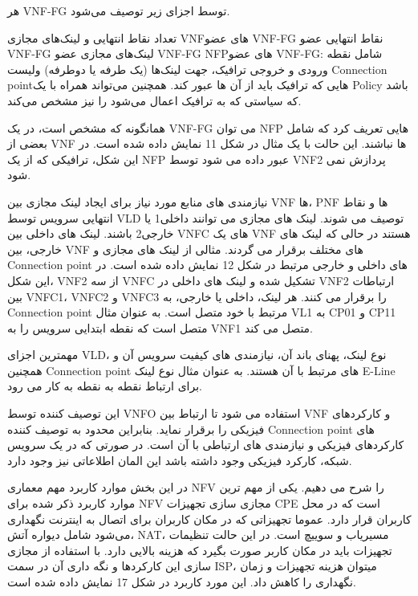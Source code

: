 \documentclass{book}
\begin{document}
هر VNF-FG توسط اجزای زیر توصیف می‌شود.

 تعداد نقاط انتهایی و لینک‌های مجازی
 VNFهای عضو VNF-FG
 نقاط انتهایی عضو VNF-FG
 لینک‌های مجازی عضو VNF-FG
 NFPهای عضو VNF-FG: شامل نقطه ورودی و خروجی ترافیک، جهت لینک‌ها (یک طرفه یا دوطرفه) ولیست Connection pointهایی که ترافیک باید از آن ها عبور کند. همچنین می‌تواند همراه با یک Policy باشد که سیاستی که به ترافیک اعمال می‌شود را نیز مشخص می‌کند.

همانگونه که مشخص است، در یک VNF-FG می توان NFP هایی تعریف کرد که شامل بعضی از VNF ها نباشند. این حالت با یک مثال در شکل 11 نمایش داده شده است. در این شکل، ترافیکی که از یک NFP عبور داده می شود توسط VNF2 پردازش نمی شود.


نیازمندی های منابع مورد نیاز برای ایجاد لینک مجازی بین VNF ها، PNF ها و نقاط انتهایی سرویس توسط VLD توصیف می شوند. لینک های مجازی می توانند داخلی1 یا خارجی2 باشند. لینک های داخلی بین VNFC های یک VNF هستند در حالی که لینک های خارجی، بین VNF های مختلف برقرار می گردند. مثالی از لینک های مجازی و Connection point های داخلی و خارجی مرتبط در شکل 12 نمایش داده شده است. در این شکل، VNF2 از سه VNFC تشکیل شده و لینک های داخلی در VNF2 ارتباطات بین VNFC1، VNFC2 و VNFC3 را برقرار می کنند. هر لینک، داخلی یا خارجی، به Connection point مرتبط با خود متصل است. به عنوان مثال VL1 به CP01 و CP11 متصل است که نقطه ابتدایی سرویس را به VNF1 متصل می کند.

مهمترین اجزای VLD، نوع لینک، پهنای باند آن، نیازمندی های کیفیت سرویس آن و همچنین Connection point های مرتبط با آن هستند. به عنوان مثال نوع لینک E-Line برای ارتباط نقطه به نقطه به کار می رود.

این توصیف کننده توسط VNFO استفاده می شود تا ارتباط بین VNF و کارکردهای فیزیکی را برقرار نماید. بنابراین محدود به توصیف کننده Connection point های کارکردهای فیزیکی و نیازمندی های ارتباطی با آن است. در صورتی که در یک سرویس شبکه، کارکرد فیزیکی وجود داشته باشد این المان اطلاعاتی نیز وجود دارد.


در این بخش موارد کاربرد مهم معماری NFV را شرح می دهیم. یکی از مهم ترین موارد کاربرد ذکر شده برای NFV مجازی سازی تجهیزات CPE است که در محل کاربران قرار دارد.
عموما تجهیزاتی که در مکان کاربران برای اتصال به اینترنت نگهداری می‌شود شامل دیواره آتش، NAT، مسیریاب و سوییچ است.
در این حالت تنظیمات تجهیزات باید در مکان کاربر صورت بگیرد که هزینه بالایی دارد. با استفاده از مجازی سازی این کارکردها و نگه داری آن در سمت ISP، میتوان هزینه تجهیزات و زمان نگهداری را کاهش داد. این مورد کاربرد در شکل 17 نمایش داده شده است.
\end{document}
